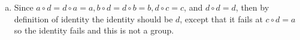 \begin{enumerate}[(a)]
\item
Since $a \circ d = d \circ a = a, b \circ d = d \circ b = b, d \circ c = c$, and $d \circ d = d$, then by definition of identity the identity should be $d$, except that it fails at $c \circ d = a$ so the identity fails and this is not a group. 
\end{enumerate}

